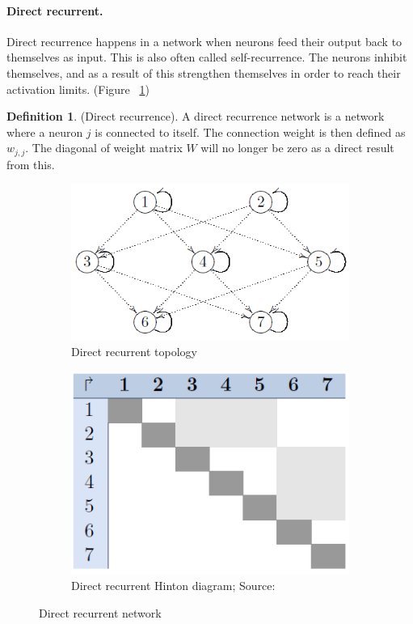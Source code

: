 \documentclass[pdftex,a4paper,12pt,twoside]{report}
\theoremstyle{plain} \newtheorem{theorem}{Theorem} \newtheorem{proposition}{Proposition} \newtheorem{lemma}{Lemma} \newtheorem*{corollary}{Corollary}
\theoremstyle{definition} \newtheorem{definition}{Definition} \newtheorem{conjecture}{Conjecture} \newtheorem*{example}{Example} \newtheorem{algorithm}{Algorithm}
\theoremstyle{remark} \newtheorem*{remark}{Remark} \newtheorem*{note}{Note} \newtheorem{case}{Case}
\begin{document}
\paragraph{Direct recurrent.}
Direct recurrence happens in a network when neurons feed their output back to themselves as input. This is also often called self-recurrence. The neurons inhibit themselves, and as a result of this strengthen themselves in order to reach their activation limits. (Figure ~\ref{fig:directrecurrent})
\begin{definition}
(Direct recurrence). A direct recurrence network is a network where a neuron $j$ is connected to itself. The connection weight is then defined as $w_{j,j}$. The diagonal of weight matrix $W$ will no longer be zero as a direct result from this.
\end{definition}
\begin{figure}
\centering
	\begin{subfigure}[b]{0.49\textwidth}
	\centering
	\includegraphics[width=\textwidth]{./img/recurrent-direct-Topology.png}
	\caption{Direct recurrent topology}
	\end{subfigure}
	\begin{subfigure}[b]{0.49\textwidth}
	\centering
	\includegraphics[width=\textwidth]{./img/recurrent-direct-Hinton.png}
	\caption{Direct recurrent Hinton diagram; Source:\citep{Kriesel2013}}
	\end{subfigure}
\caption{Direct recurrent network}
\label{fig:directrecurrent}
\end{figure}
\end{document}
